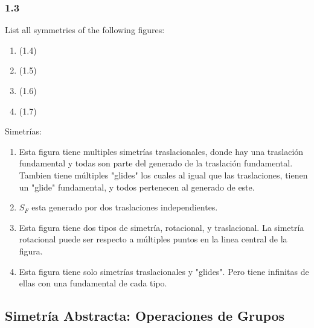 \documentclass[11pt]{article}
\theoremstyle{definition}
\begin{document}
\subsubsection{1.3}
List all symmetries of the following figures:
\begin{enumerate}[label=(\alph*)]
    \item (1.4)

    \item (1.5)

    \item (1.6)

    \item (1.7)
\end{enumerate}
Simetrías:
\begin{enumerate}[label=(\alph*)]
    \item Esta figura tiene multiples simetrías traslacionales, donde hay una traslación fundamental y todas son parte del  generado de la traslación fundamental. Tambien tiene múltiples "glides" los cuales al igual que las traslaciones, tienen un "glide" fundamental, y todos pertenecen al generado de este.

    \item $S_F$ esta generado por dos traslaciones independientes.

    \item Esta figura tiene dos tipos de simetría, rotacional, y traslacional. La simetría rotacional puede ser respecto a múltiples puntos en la linea central de la figura.

    \item Esta figura tiene solo simetrías traslacionales y "glides". Pero tiene infinitas de ellas con una fundamental de cada tipo.
\end{enumerate}

\subsection{Simetría Abstracta: Operaciones de Grupos}
\end{document}
